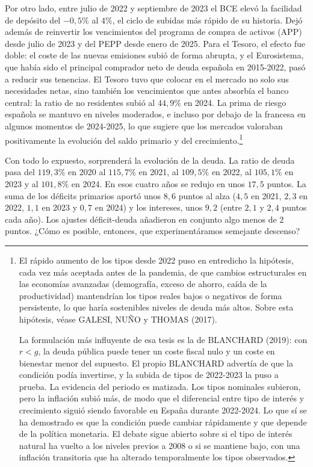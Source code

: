 \documentclass[10pt,a4paper]{article}
\begin{document}
Por otro lado, entre julio de 2022 y septiembre de 2023 el BCE elevó la facilidad de depósito del $-0,5\%$ al $4\%$, el ciclo de subidas más rápido de su historia. Dejó además de reinvertir los vencimientos del programa de compra de activos (APP) desde julio de 2023 y del PEPP desde enero de 2025. Para el Tesoro, el efecto fue doble: el coste de las nuevas emisiones subió de forma abrupta, y el Eurosistema, que había sido el principal comprador neto de deuda española en 2015-2022, pasó a reducir sus tenencias. El Tesoro tuvo que colocar en el mercado no solo sus necesidades netas, sino también los vencimientos que antes absorbía el banco central: la ratio de no residentes subió al $44,9\%$ en 2024. La prima de riesgo española se mantuvo en niveles moderados, e incluso por debajo de la francesa en algunos momentos de 2024-2025, lo que sugiere que los mercados valoraban positivamente la evolución del saldo primario y del crecimiento.\footnote{El rápido aumento de los tipos desde 2022 puso en entredicho la hipótesis, cada vez más aceptada antes de la pandemia, de que cambios estructurales en las economías avanzadas (demografía, exceso de ahorro, caída de la productividad) mantendrían los tipos reales bajos o negativos de forma persistente, lo que haría sostenibles niveles de deuda más altos. Sobre esta hipótesis, véase GALESI, NUÑO y THOMAS (2017).

La formulación más influyente de esa tesis es la de BLANCHARD (2019): con $r < g$, la deuda pública puede tener un coste fiscal nulo y un coste en bienestar menor del supuesto. El propio BLANCHARD advertía de que la condición podía invertirse, y la subida de tipos de 2022-2023 la puso a prueba. La evidencia del periodo es matizada. Los tipos nominales subieron, pero la inflación subió más, de modo que el diferencial entre tipo de interés y crecimiento siguió siendo favorable en España durante 2022-2024. Lo que sí se ha demostrado es que la condición puede cambiar rápidamente y que depende de la política monetaria. El debate sigue abierto sobre si el tipo de interés natural ha vuelto a los niveles previos a 2008 o si se mantiene bajo, con una inflación transitoria que ha alterado temporalmente los tipos observados.
}

Con todo lo expuesto, sorprenderá la evolución de la deuda. La ratio de deuda pasa del $119,3\%$ en 2020 al $115,7\%$ en 2021, al $109,5\%$ en 2022, al $105,1\%$ en 2023 y al $101,8\%$ en 2024. En esos cuatro años se redujo en unos $17,5$ puntos. La suma de los déficits primarios aportó unos $8,6$ puntos al alza ($4,5$ en 2021, $2,3$ en 2022, $1,1$ en 2023 y $0,7$ en 2024) y los intereses, unos $9,2$ (entre $2,1$ y $2,4$ puntos cada año). Los ajustes déficit-deuda añadieron en conjunto algo menos de $2$ puntos. ¿Cómo es posible, entonces, que experimentáramos semejante descenso?
\end{document}
